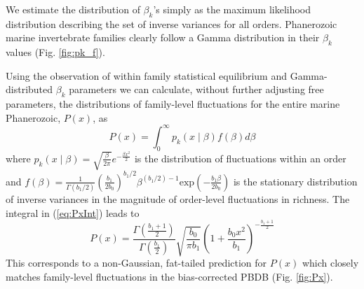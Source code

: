 \documentclass[12pt]{article}
\begin{document}

We estimate the distribution of $\beta_k$'s simply as the maximum
likelihood distribution describing the set of inverse variances for
all orders. Phanerozoic marine invertebrate families clearly follow a
Gamma distribution in their $\beta_k$ values (Fig. \ref{fig:pk_f}).

Using the observation of within family statistical equilibrium and
Gamma-distributed $\beta_k$ parameters we can calculate, without
further adjusting free parameters, the distributions of family-level
fluctuations for the entire marine Phanerozoic, $P(x)$, as
\begin{equation}
  P(x) = \int_0^\infty p_k(x \mid \beta) f(\beta) d\beta \label{eq:PxInt}
\end{equation}
where
$p_k(x \mid \beta) = \sqrt{\frac{\beta}{2\pi}} e^{-\frac{\beta
    x^2}{2}}$ is the distribution of fluctuations within an order and
$f(\beta) = \frac{1}{\Gamma(b_1/2)}
\left(\frac{b_1}{2b_0}\right)^{b_1/2} \beta^{(b_1/2) - 1}
\text{exp}\left(-\frac{b_1 \beta}{2 b_0}\right)$ is the stationary
distribution of inverse variances in the magnitude of order-level
fluctuations in richness. The integral in (\ref{eq:PxInt}) leads to
\begin{equation}
  \label{eq:Px}
  P(x) = \frac{\Gamma\left(\frac{b_1 +
        1}{2}\right)}{\Gamma\left(\frac{b_1}{2}\right)}
  \sqrt{\frac{b_0}{\pi b_1}} \left(1 + \frac{b_0
      x^2}{b_1}\right)^{-\frac{b_1 + 1}{2}}
\end{equation}
This corresponds to a non-Gaussian, fat-tailed prediction for $P(x)$
which closely matches family-level fluctuations in the bias-corrected
PBDB (Fig. \ref{fig:Px}).
\end{document}
